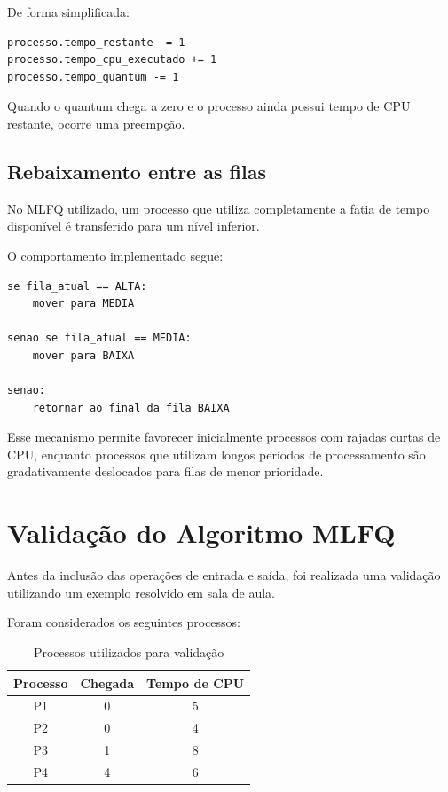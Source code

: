 \documentclass[12pt,a4paper]{article}
\begin{document}
De forma simplificada:

\begin{lstlisting}
processo.tempo_restante -= 1
processo.tempo_cpu_executado += 1
processo.tempo_quantum -= 1
\end{lstlisting}

Quando o quantum chega a zero e o processo ainda possui tempo de CPU
restante, ocorre uma preempção.



\subsection{Rebaixamento entre as filas}

No MLFQ utilizado, um processo que utiliza completamente a fatia de
tempo disponível é transferido para um nível inferior.

O comportamento implementado segue:

\begin{lstlisting}
se fila_atual == ALTA:
    mover para MEDIA

senao se fila_atual == MEDIA:
    mover para BAIXA

senao:
    retornar ao final da fila BAIXA
\end{lstlisting}

Esse mecanismo permite favorecer inicialmente processos com rajadas
curtas de CPU, enquanto processos que utilizam longos períodos de
processamento são gradativamente deslocados para filas de menor
prioridade.



\section{Validação do Algoritmo MLFQ}

Antes da inclusão das operações de entrada e saída, foi realizada uma
validação utilizando um exemplo resolvido em sala de aula.

Foram considerados os seguintes processos:

\begin{table}[H]
    \centering
    \caption{Processos utilizados para validação}
    \begin{tabular}{ccc}
        \toprule
        \textbf{Processo} &
        \textbf{Chegada} &
        \textbf{Tempo de CPU} \\
        \midrule
        P1 & 0 & 5 \\
        P2 & 0 & 4 \\
        P3 & 1 & 8 \\
        P4 & 4 & 6 \\
        \bottomrule
    \end{tabular}
\end{table}
\end{document}

